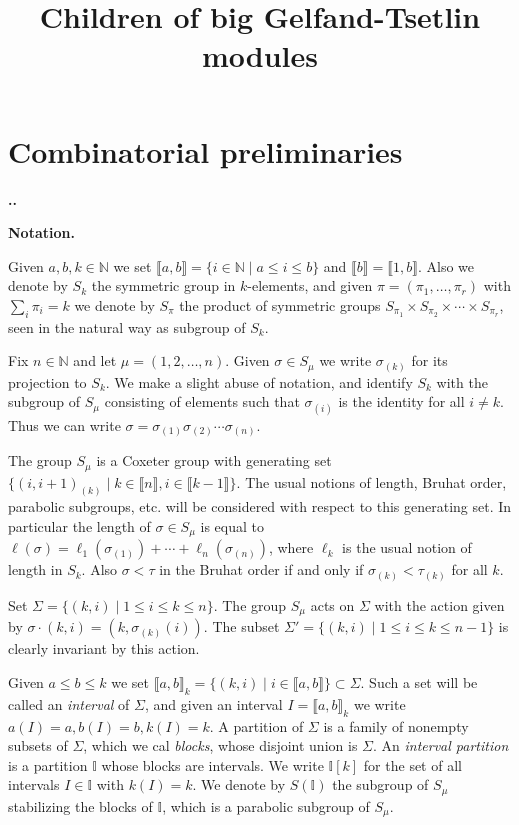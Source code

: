 \documentclass[11pt,fleqn]{amsart}
\title{Children of big Gelfand-Tsetlin modules}
\date{}
\renewcommand\thesection{\arabic{section}}
\newcounter{para}[section]
\renewcommand\thepara{\thesection.\arabic{para}}
\def\paragraph{%
 \noindent
 \refstepcounter{para}%
 \textbf{\thepara.}\hspace{1ex}%
}
\newcommand\about[1]{%
 {\bfseries#1.}%
}
\newcommand\NN{\mathbb N}
\newcommand\II{\mathbb I}
\newcommand\interval[1]{\llbracket #1 \rrbracket}
\begin{document}
\maketitle
\section{Combinatorial preliminaries}

\paragraph
\about{Notation}
\label{notation}
Given $a,b,k \in \NN$ we set $\interval{a,b} = \{i \in \NN \mid a \leq i \leq 
b\}$ and $\interval{b} = \interval{1,b}$. Also we denote by $S_k$ the 
symmetric group in $k$-elements, and given $\pi = (\pi_1, \ldots, \pi_r)$
with $\sum_i \pi_i = k$ we denote by $S_\pi$ the product of symmetric groups
$S_{\pi_1} \times S_{\pi_2} \times \cdots \times S_{\pi_r}$, seen in the 
natural way as subgroup of $S_k$.

Fix $n \in \NN$ and let $\mu = (1, 2, \ldots, n)$. Given $\sigma \in S_\mu$ we 
write $\sigma_{(k)}$ for its projection to $S_k$. We make a slight abuse of 
notation, and identify $S_k$ with the subgroup of $S_\mu$ consisting of 
elements such that $\sigma_{(i)}$ is the identity for all $i \neq k$. Thus we 
can write $\sigma = \sigma_{(1)} \sigma_{(2)} \cdots \sigma_{(n)}$.

The group $S_\mu$ is a Coxeter group with generating set $\{(i,i+1)_{(k)}
\mid k \in \interval{n}, i \in \interval{k-1}\}$. The usual notions of length,
Bruhat order, parabolic subgroups, etc. will be considered with respect to 
this generating set. In particular the length of $\sigma \in S_\mu$ is equal 
to $\ell(\sigma) = \ell_1(\sigma_{(1)}) + \cdots + \ell_n(\sigma_{(n)})$, 
where $\ell_k$ is the usual notion of length in $S_k$. Also $\sigma < \tau$ in 
the Bruhat order if and only if $\sigma_{(k)} < \tau_{(k)}$ for all $k$.

Set $\Sigma = \{(k,i) \mid 1 \leq i \leq k \leq n\}$. The group $S_\mu$ acts 
on $\Sigma$ with the action given by $\sigma \cdot (k,i) = (k, 
\sigma_{(k)}(i))$. The subset $\Sigma' = \{(k,i) \mid 1 \leq i \leq k \leq n-1
\}$ is clearly invariant by this action. 

Given $a \leq b \leq k$ we set $\interval{a,b}_k = \{(k,i) \mid i \in 
\interval{a,b}\} \subset \Sigma$. Such a set will be called an \emph{interval}
of $\Sigma$, and given an interval $I = \interval{a,b}_k$ we write $a(I) = a,
b(I) = b, k(I) = k$. A partition of $\Sigma$ is a family of nonempty subsets 
of $\Sigma$, which we cal \emph{blocks}, whose disjoint union is $\Sigma$.
An \emph{interval partition} is a partition $\II$ whose blocks are intervals. 
We write $\II[k]$ for the set of all intervals $I \in \II$ with $k(I) = k$. 
We denote by $S(\II)$ the subgroup of $S_\mu$ stabilizing the blocks of $\II$,
which is a parabolic subgroup of $S_\mu$.
\end{document}
